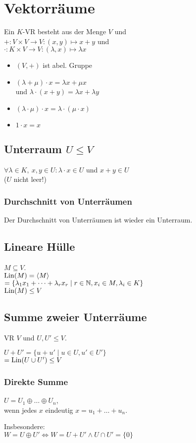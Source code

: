 \section*{Vektorräume}

Ein $K$-VR besteht aus der Menge $V$ und \\
$+: V\times V \to V : (x,y) \mapsto x + y$ und \\
$\cdot : K \times V \to V: (\lambda, x) \mapsto \lambda x$
\begin{itemize}
	\item $(V,+)$ ist abel. Gruppe
	\item $(\lambda + \mu)\cdot x = \lambda x + \mu x$ \\
		und $\lambda\cdot(x+y) = \lambda x + \lambda y$
	\item $(\lambda \cdot \mu)\cdot x = \lambda \cdot (\mu \cdot x)$
	\item $1\cdot x = x$
\end{itemize}

\subsection*{Unterraum $U \le V$}
$\forall \lambda \in K,~ x,y \in U: \lambda\cdot x\in U$ und $x+y\in U$ \\
($U$ nicht leer!)

\subsubsection*{Durchschnitt von Unterräumen}
Der Durchschnitt von Unterräumen ist wieder ein Unterraum.

\subsection*{Lineare Hülle}
$M\subseteq V$. \\
$\operatorname{Lin}(M)=\langle M \rangle$\\
$= \{\lambda_1 x_1 + \dots + \lambda_r x_r \mid r\in\mathbb{N}, x_i \in M, \lambda_i \in K\}$ \\
$\operatorname{Lin}(M)\le V $

\subsection*{Summe zweier Unterräume}
VR $V$ und $U,U' \le V$.

$U + U' = \{u + u' \mid u\in U, u' \in U'\}$ \\
$= \operatorname{Lin}(U\cup U') \le V$

\subsubsection*{Direkte Summe}
$U = U_1 \oplus \dots \oplus U_n$, \\
wenn jedes $x$ eindeutig $x = u_1 + \dots + u_n$.

Insbesondere: \\
$W = U \oplus U' \Leftrightarrow W = U + U' \land U\cap U' = \{0\}$
